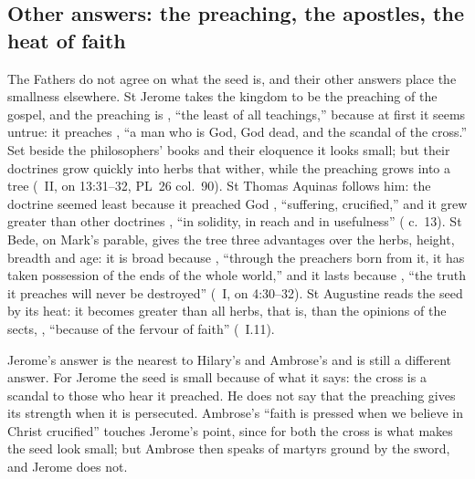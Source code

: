 \subsection{Other answers: the preaching, the apostles, the heat of faith}
\label{sec:seed-others}

The Fathers do not agree on what the seed is, and their other answers place
the smallness elsewhere. St Jerome takes the kingdom to be the preaching of
the gospel, and the preaching is ,
``the least of all teachings,'' because at first it seems untrue: it preaches
, ``a man who is God,
God dead, and the scandal of the cross.'' Set beside the philosophers' books
and their eloquence it looks small; but their doctrines grow quickly into
herbs that wither, while the preaching grows into a tree (~II, on 13:31--32, PL~26 col.~90). St Thomas Aquinas follows him:
the doctrine seemed least because it preached God , ``suffering, crucified,'' and it grew greater than other
doctrines , ``in
solidity, in reach and in usefulness'' (
c.~13). St Bede, on Mark's parable, gives the tree three advantages over the
herbs, height, breadth and age: it is broad because , ``through the preachers
born from it, it has taken possession of the ends of the whole world,'' and
it lasts because ,
``the truth it preaches will never be destroyed'' (~I, on
4:30--32). St Augustine reads the seed by its heat: it becomes greater than
all herbs, that is, than the opinions of the sects, , ``because of the fervour of faith'' (~I.11).

Jerome's answer is the nearest to Hilary's and Ambrose's and is still a
different answer. For Jerome the seed is small because of what it says: the
cross is a scandal to those who hear it preached. He does not say that the
preaching gives its strength when it is persecuted. Ambrose's ``faith is
pressed when we believe in Christ crucified'' touches Jerome's point, since
for both the cross is what makes the seed look small; but Ambrose then speaks
of martyrs ground by the sword, and Jerome does not.

